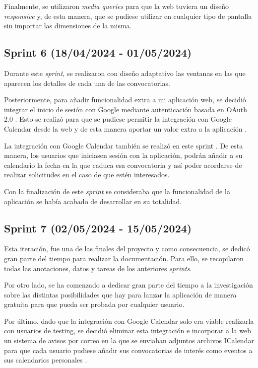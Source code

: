 Finalmente, se utilizaron \textit{media queries} para que la web tuviera un diseño \textit{responsive}  y, de esta manera, que se pudiese utilizar en cualquier tipo de pantalla sin importar las dimensiones de la misma.


\subsection{Sprint 6 (18/04/2024 -
01/05/2024)}

Durante este \textit{sprint}, se realizaron con diseño adaptativo las ventanas en las que aparecen los detalles de cada una de las convocatorias.

Posteriormente, para añadir funcionalidad extra a mi aplicación web, se decidió integrar el inicio de sesión con Google mediante autenticación basada en OAuth 2.0 \cite{autenticaciongoogle:latex}. Esto se realizó para que se pudiese permitir la integración con Google Calendar desde la web y de esta manera aportar un valor extra a la aplicación .

La integración con Google Calendar también se realizó en este sprint \cite{googlecalendar:latex}. De esta manera, los usuarios que iniciasen sesión con la aplicación, podrán añadir a su calendario la fecha en la que caduca esa convocatoria y así poder acordarse de realizar solicitudes en el caso de que estén interesados.

Con la finalización de este \textit{sprint} se consideraba que la funcionalidad de la aplicación se había acabado de desarrollar en su totalidad.


\subsection{Sprint 7 (02/05/2024 -
15/05/2024)}
Esta iteración, fue una de las finales del proyecto y como consecuencia, se dedicó gran parte del tiempo para realizar la documentación. Para ello, se recopilaron todas las anotaciones, datos y tareas de los anteriores \textit{sprints}. 

Por otro lado, se ha comenzado a dedicar gran parte del tiempo a la investigación sobre las distintas posibilidades que hay para lanzar la aplicación de manera gratuita para que pueda ser probada por cualquier usuario.

Por último, dado que la integración con Google Calendar solo era viable realizarla con usuarios de testing, se decidió eliminar esta integración e incorporar a la web un sistema de avisos por correo en la que se enviaban adjuntos archivos ICalendar para que cada usuario pudiese añadir sus convocatorias de interés como eventos a sus calendarios personales \cite{icalendar:latex}.

